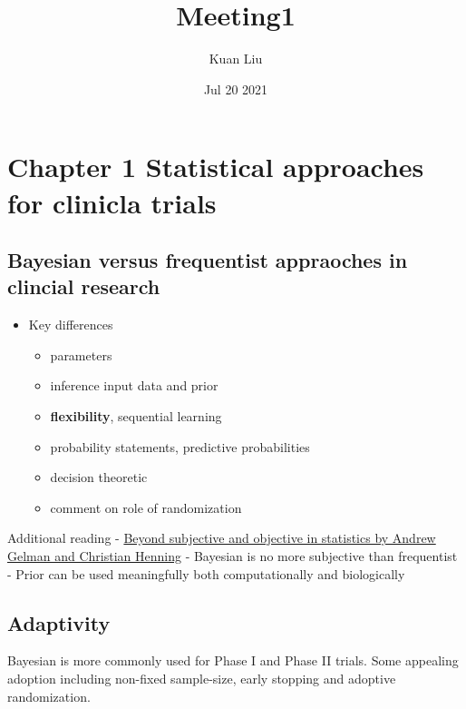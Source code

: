 \documentclass[
]{article}
\title{Meeting1}
\author{Kuan Liu}
\date{Jul 20 2021}
\providecommand{\tightlist}{%
  \setlength{\itemsep}{0pt}\setlength{\parskip}{0pt}}
\begin{document}
\maketitle

\hypertarget{chapter-1-statistical-approaches-for-clinicla-trials}{%
\section{Chapter 1 Statistical approaches for clinicla
trials}\label{chapter-1-statistical-approaches-for-clinicla-trials}}

\hypertarget{bayesian-versus-frequentist-appraoches-in-clincial-research}{%
\subsection{Bayesian versus frequentist appraoches in clincial
research}\label{bayesian-versus-frequentist-appraoches-in-clincial-research}}

\begin{itemize}
\tightlist
\item
  Key differences

  \begin{itemize}
  \tightlist
  \item
    parameters
  \item
    inference input data and prior
  \item
    \textbf{flexibility}, sequential learning
  \item
    probability statements, predictive probabilities
  \item
    decision theoretic
  \item
    comment on role of randomization
  \end{itemize}
\end{itemize}

Additional reading -
\href{http://www.stat.columbia.edu/~gelman/research/published/gelman_hennig_full_discussion.pdf}{Beyond
subjective and objective in statistics by Andrew Gelman and Christian
Henning} - Bayesian is no more subjective than frequentist - Prior can
be used meaningfully both computationally and biologically

\hypertarget{adaptivity}{%
\subsection{Adaptivity}\label{adaptivity}}

Bayesian is more commonly used for Phase I and Phase II trials. Some
appealing adoption including non-fixed sample-size, early stopping and
adoptive randomization.
\end{document}
